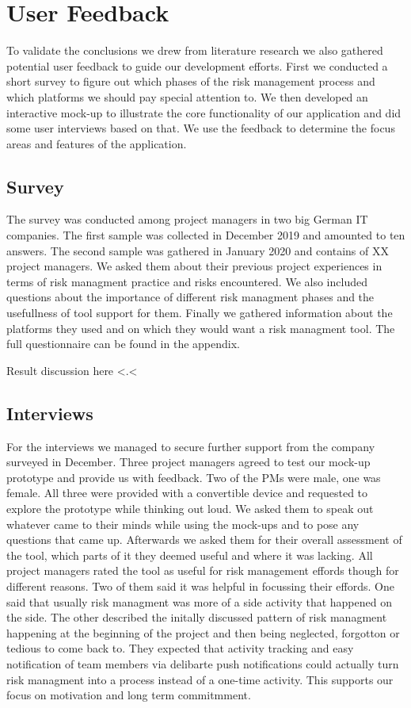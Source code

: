 
\section{User Feedback}
\label{sec:DomainA}
To validate the conclusions we drew from literature research we also gathered potential user feedback to guide our development efforts. First we conducted a short survey to figure out which phases of the risk management process and which platforms we should pay special attention to. We then developed an interactive mock-up to illustrate the core functionality of our application and did some user interviews based on that. We use the feedback to determine the focus areas and features of the application.
\subsection{Survey}
\label{sec:DomainAa}
The survey was conducted among project managers in two big German IT companies. The first sample was collected in December 2019 and amounted to ten answers. The second sample was gathered in January 2020 and contains of XX project managers. We asked them about their previous project experiences in terms of risk managment practice and risks encountered. We also included questions about the importance of different risk managment phases and the usefullness of tool support for them. Finally we gathered information about the platforms they used and on which they would want a risk managment tool. The full questionnaire can be found in the appendix.

Result discussion here <.<

\subsection{Interviews}
\label{sec:DomainAb}
For the interviews we managed to secure further support from the company surveyed in December. Three project managers agreed to test our mock-up prototype and provide us with feedback. Two of the PMs were male, one was female. All three were provided with a convertible device and requested to explore the prototype while thinking out loud. We asked them to speak out whatever came to their minds while using the mock-ups and to pose any questions that came up. Afterwards we asked them for their overall assessment of the tool, which parts of it they deemed useful and where it was lacking.
All project managers rated the tool as useful for risk management effords though for different reasons. Two of them said it was helpful in focussing their effords. One said that usually risk managment was more of a side activity that happened on the side. The other described the initally discussed pattern of risk managment happening at the beginning of the project and then being neglected, forgotton or tedious to come back to. They expected that activity tracking and easy notification of team members via delibarte push notifications could actually turn risk managment into a process instead of a one-time activity. This supports our focus on motivation and long term commitmment.

